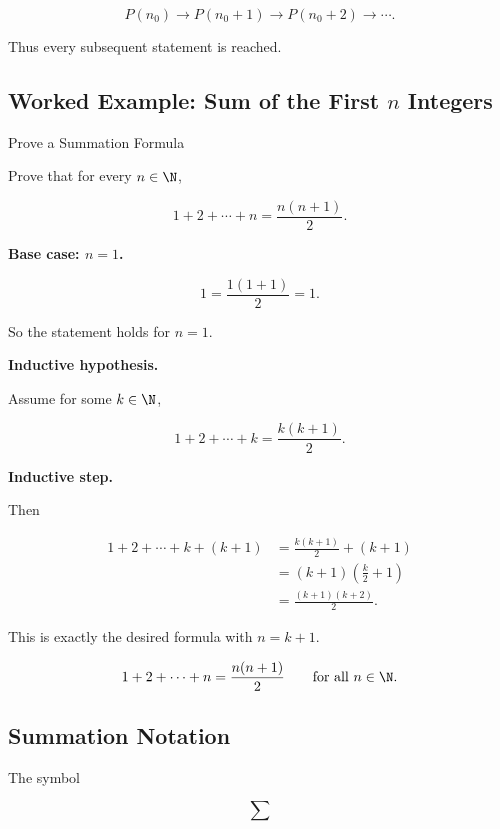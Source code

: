 \[ P(n_0)\to P(n_0+1)\to P(n_0+2)\to\cdots. \]

Thus every subsequent statement is reached.

\subsection{Worked Example: Sum of the First \(n\) Integers}
\label{subsec:worked-induction-sum}

\begin{workedexamplebox}{Prove a Summation Formula}

Prove that for every \(n\in\N\),

\[ 1+2+\cdots+n=\frac{n(n+1)}2. \]

\textbf{Base case: \(n=1\).}

\[ 1=\frac{1(1+1)}2=1. \]

So the statement holds for \(n=1\).

\textbf{Inductive hypothesis.}

Assume for some \(k\in\N\),

\[ 1+2+\cdots+k=\frac{k(k+1)}2. \]

\textbf{Inductive step.}

Then

\[
\begin{aligned}
1+2+\cdots+k+(k+1)
&=\frac{k(k+1)}2+(k+1)\\
&=(k+1)\left(\frac{k}{2}+1\right)\\
&=\frac{(k+1)(k+2)}2.
\end{aligned}
\]

This is exactly the desired formula with \(n=k+1\).

\begin{answerbox}
\[ 1+2+\cdots+n=\frac{n(n+1)}2 \qquad\text{for all }n\in\N. \]
\end{answerbox}
\end{workedexamplebox}

\subsection{Summation Notation}
\label{subsec:summation-notation-proof}

The symbol

\[ \sum \]

